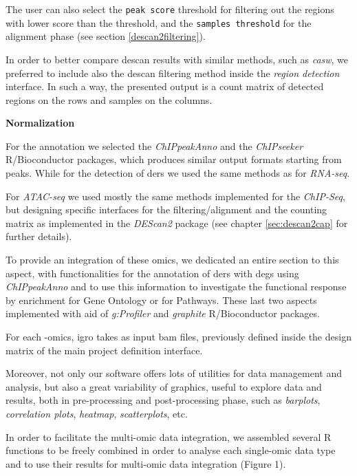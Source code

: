 The user can also select the \lstinline!peak score! threshold for filtering out the regions with lower score than the threshold, and the \lstinline!samples threshold! for the alignment phase (see section \ref{descan2filtering}).

In order to better compare \gls{descan} results with similar methods, such as \textit{casw}, we preferred to include also the \gls{descan} filtering method inside the \textit{region detection} interface.
In such a way, the presented output is a count matrix of detected regions on the rows and samples on the columns.

{\setlength{\parindent}{0cm}\textbf{Normalization}}



For the annotation we selected the \textit{ChIPpeakAnno} and the \textit{ChIPseeker} R/Bioconductor packages, which produces similar output formats starting from peaks.
While for the detection of \glspl{der} we used the same methods as for \textit{RNA-seq}.

For \textit{ATAC-seq} we used mostly the same methods implemented for the \textit{ChIP-Seq}, but designing specific interfaces for the filtering/alignment and the counting matrix as implemented in the \textit{DEScan2} package (see chapter \ref{sec:descan2cap} for further details).

To provide an integration of these omics, we dedicated an entire section to this aspect, with functionalities for the annotation of \glspl{der} with \glspl{deg} using \textit{ChIPpeakAnno} and to use this information to investigate the functional response by enrichment for Gene Ontology or for Pathways.
These last two aspects implemented with aid of \textit{g:Profiler} \cite{Reimand2016} and \textit{graphite} \cite{Sales2012a} R/Bioconductor packages.


For each -omics, \gls{igro} takes as input \gls{bam} files, previously defined inside the design matrix of the main project definition interface.

Moreover, not only our software offers lots of utilities for data management and analysis, but also a great variability of graphics, useful to explore data and results, both in pre-processing and post-processing phase, such as \textit{barplots}, \textit{correlation plots}, \textit{heatmap}, \textit{scatterplots}, etc.

In order to facilitate the multi-omic data integration, we assembled several R functions to be freely combined in order to analyse each single-omic data type and to use their results for multi-omic data integration (Figure 1).